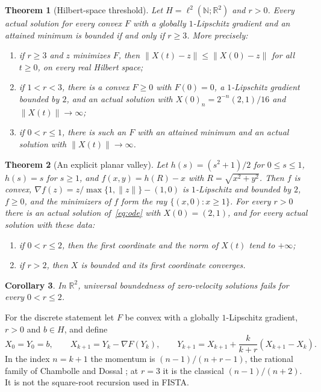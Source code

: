 \documentclass[11pt]{article}
\numberwithin{equation}{section}
\newtheorem{theorem}{Theorem}[section]
\newtheorem{corollary}[theorem]{Corollary}
\theoremstyle{definition}
\theoremstyle{remark}
\newcommand{\R}{\mathbb R}
\newcommand{\N}{\mathbb N}
\newcommand{\norm}[1]{\lVert #1\rVert}
\begin{document}
\begin{theorem}[Hilbert-space threshold]\label{thm:hilbert}
Let $H=\ell^2(\N;\R^2)$ and $r>0$. Every actual solution for every convex $F$ with a globally $1$-Lipschitz gradient and an attained minimum is bounded if and only if $r\ge3$. More precisely:
\begin{enumerate}[label=(\alph*)]
\item if $r\ge3$ and $z$ minimizes $F$, then $\norm{X(t)-z}\le\norm{X(0)-z}$ for all $t\ge0$, on every real Hilbert space;
\item if $1<r<3$, there is a convex $F\ge0$ with $F(0)=0$, a $1$-Lipschitz gradient bounded by $2$, and an actual solution with $X(0)_n=2^{-n}(2,1)/16$ and $\norm{X(t)}\to\infty$;
\item if $0<r\le1$, there is such an $F$ with an attained minimum and an actual solution with $\norm{X(t)}\to\infty$.
\end{enumerate}
\end{theorem}

\begin{theorem}[An explicit planar valley]\label{thm:planar}
Let $h(s)=(s^2+1)/2$ for $0\le s\le1$, $h(s)=s$ for $s\ge1$, and $f(x,y)=h(R)-x$ with $R=\sqrt{x^2+y^2}$. Then $f$ is convex, $\nabla f(z)=z/\max\{1,\norm z\}-(1,0)$ is $1$-Lipschitz and bounded by $2$, $f\ge0$, and the minimizers of $f$ form the ray $\{(x,0):x\ge1\}$. For every $r>0$ there is an actual solution of~\eqref{eq:ode} with $X(0)=(2,1)$, and for every actual solution with these data:
\begin{enumerate}[label=(\alph*)]
\item if $0<r\le2$, then the first coordinate and the norm of $X(t)$ tend to $+\infty$;
\item if $r>2$, then $X$ is bounded and its first coordinate converges.
\end{enumerate}
\end{theorem}

\begin{corollary}\label{cor:finite}
In $\R^2$, universal boundedness of zero-velocity solutions fails for every $0<r\le2$.
\end{corollary}

For the discrete statement let $F$ be convex with a globally $1$-Lipschitz gradient, $r>0$ and $b\in H$, and define
\begin{equation}\label{eq:nag}
X_0=Y_0=b,\qquad X_{k+1}=Y_k-\nabla F(Y_k),\qquad Y_{k+1}=X_{k+1}+\frac k{k+r}(X_{k+1}-X_k).
\end{equation}
In the index $n=k+1$ the momentum is $(n-1)/(n+r-1)$, the rational family of Chambolle and Dossal \cite{ChambolleDossal}; at $r=3$ it is the classical $(n-1)/(n+2)$. It is not the square-root recursion used in FISTA.
\end{document}
